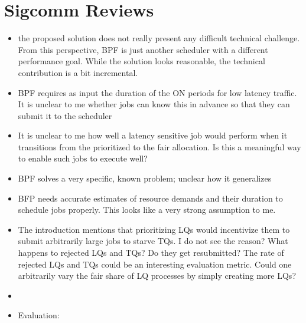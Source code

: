 \section*{Sigcomm Reviews}

\begin{itemize}
	\item the proposed solution does not really present any difficult technical challenge. From this perspective, BPF is just another scheduler with a different performance goal. While the solution looks reasonable, the technical contribution is a bit incremental.
	\item BPF requires as input the duration of the ON periods for low latency traffic. It is unclear to me whether jobs can know this in advance so that they can submit it to the scheduler
	\item It is unclear to me how well a latency sensitive job would perform when it transitions from the prioritized to the fair allocation. Is this a meaningful way to enable such jobs to execute well?
	\item BPF solves a very specific, known problem; unclear how it generalizes
	\item BFP needs accurate estimates of resource demands and their duration to schedule jobs properly. This looks like a very strong assumption to me.
	\item The introduction mentions that prioritizing LQs would incentivize them to submit arbitrarily large jobs to starve TQs. I do not see the reason? What happens to rejected LQs and TQs? Do they get resubmitted? The rate of rejected LQs and TQs could be an interesting evaluation metric. Could one arbitrarily vary the fair share of LQ processes by simply creating more LQs?
	\item {}
	\item Evaluation:  
\end{itemize}


